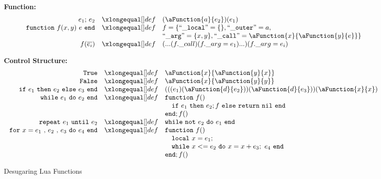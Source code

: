 \begin{figure}
\caption{Desugaring Lua Functions}\label{fig:desLuaFunc}
{\bf Function:}\[
\begin{array}{rclcl}
\desugar{e_1{\tt ;}~e_2}{(\aFunction{a}{e_2})(e_1)}
\desugar{{\tt function}~f(x,y)~e~{\tt end}}{f = \{ {\tt ``\_local"} = \{\}, {\tt ``\_outer"} = a,}
\desugarline{{\tt ``\_arg"} = \{x, y\}, {\tt ``\_call"} = \aFunction{x}{\aFunction{y}{e}}\}}
\desugar{f(\overline{e_i})}{(...(f.\_call)(f.\_arg = e_1)...)(f.\_arg = e_i)}
\end{array}\]

{\bf Control Structure:}\[
\begin{array}{rclcl}

\desugar{\tt True}{\aFunction{x}{\aFunction{y}{x}}}
\desugar{\tt False}{\aFunction{x}{\aFunction{y}{y}}}
\desugar{
    {\tt if}~e_1~{\tt then}~e_2~{\tt else}~e_3~{\tt end}
}{
    (((e_1)(\aFunction{d}{e_2}))(\aFunction{d}{e_3}))(\aFunction{x}{x})
}
\desugar{{\tt while}~e_1~{\tt do}~e_2~{\tt end}}{
    {\tt function}~f()
}
\desugarline{ \quad{\tt if}~e_1~{\tt then}~e_2;f~{\tt else}~{\tt return}~{\tt nil}~{\tt end}\\
{\tt end};f()
}
\desugar{{\tt repeat}~e_1~{\tt until}~e_2}{
   {\tt while}~{\tt not}~e_2~{\tt do}~e_1~{\tt end}\\
}
\desugar{{\tt for}~x=e_1~{\tt ,}~e_2~{\tt ,}~e_3~{\tt do}~e_4~{\tt end}}{
    {\tt function}~f()
}
\desugarline{
    \quad {\tt local}~x = e_1;\\
    \quad {\tt while}~x<= e_2~{\tt do}~x = x + e_3;~e_4~{\tt end}\\
    {\tt end};f()\\
}
\end{array}\]
\end{figure}